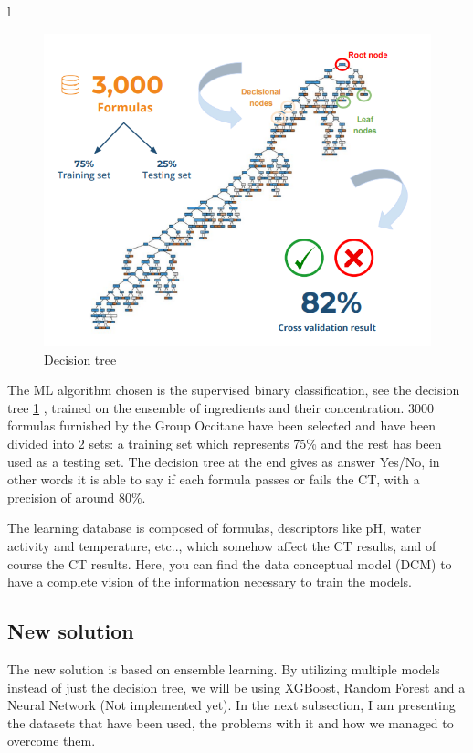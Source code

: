 l\documentclass[a4paper,12pt,twoside]{report}
\begin{document}
\begin{figure}
		\includegraphics[width=\textwidth]{images/binaryTree}
	\caption[Current Decision Tree for CT prediction]{Decision tree}
\label{Decision tree}
\end{figure}
The ML algorithm chosen is the supervised binary classification, see the decision tree \ref{Decision tree} , trained on the ensemble of ingredients and their concentration. 3000 formulas furnished by the Group Occitane have been selected and have been divided into 2 sets: a training set which represents 75\% and the rest has been used as a testing set.
The decision tree at the end gives as answer Yes/No, in other words it is able to say if each formula passes or fails the CT, with a precision of around 80\%.

The learning database is composed of formulas, descriptors like pH, water activity and temperature, etc.., which somehow affect the CT results, and of course the CT results. Here, you can find the data conceptual model (DCM) to have a complete vision of the information necessary to train the models.
\subsection{New solution}
The new solution is based on ensemble learning. By utilizing multiple models instead of just the decision tree, we will be using XGBoost, Random Forest and a Neural Network (Not implemented yet). In the next subsection, I am presenting the datasets that have been used, the problems with it and how we managed to overcome them.
\end{document}
